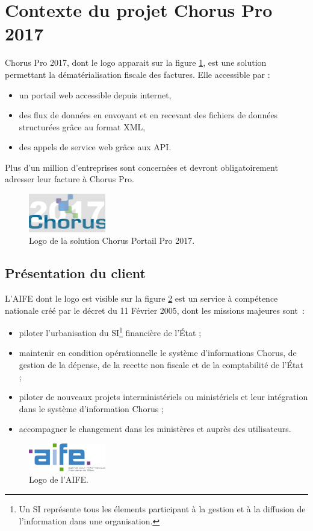 \documentclass[12pt,a4paper]{article}
\begin{document}
\section{Contexte du projet Chorus Pro 2017}
Chorus Pro 2017, dont le logo apparait sur la figure \ref{logoCpp}, est une solution  permettant la dématérialisation fiscale des factures. Elle accessible par :
\begin{itemize}
\item un portail web accessible depuis internet,
\item des flux de données en envoyant et en recevant des fichiers de données structurées grâce au format \gls{XML},
\item des appels de service web grâce aux \gls{API}.
\end{itemize}
Plus d'un million d'entreprises sont concernées et devront obligatoirement adresser leur facture à Chorus Pro.
\begin{figure}[H]
	\begin{center}
		\includegraphics[width=0.3\textwidth, height=\textheight, keepaspectratio]{cpp2017.png}
		\caption{Logo de la solution Chorus Portail Pro 2017.}
		\label{logoCpp}
	\end{center}
\end{figure}
\subsection{Présentation du client}
L'\gls{AIFE} dont le logo est visible sur la figure \ref{logoAife} est un service à compétence nationale créé par le décret du 11 Février 2005, dont les missions majeures sont~:
\begin{itemize}
\item piloter l’urbanisation du \gls{SI}\footnote{Un SI représente tous les élements participant à la gestion et à la diffusion de l'information dans une organisation.} financière de l’État ;
\item maintenir en condition opérationnelle le système d’informations Chorus, de gestion de la dépense, de la recette non fiscale et de la comptabilité de l’État ;
\item piloter de nouveaux projets interministériels ou ministériels et leur intégration dans le système d’information Chorus ;
\item accompagner le changement dans les ministères et auprès des utilisateurs.
\end{itemize}
\begin{figure}[H]
\begin{center}
\includegraphics[width=0.3\textwidth, height=\textheight, keepaspectratio]{aifedef.png}
\caption{Logo de l'AIFE.}
\label{logoAife}
\end{center}
\end{figure}
\newpage
\end{document}
